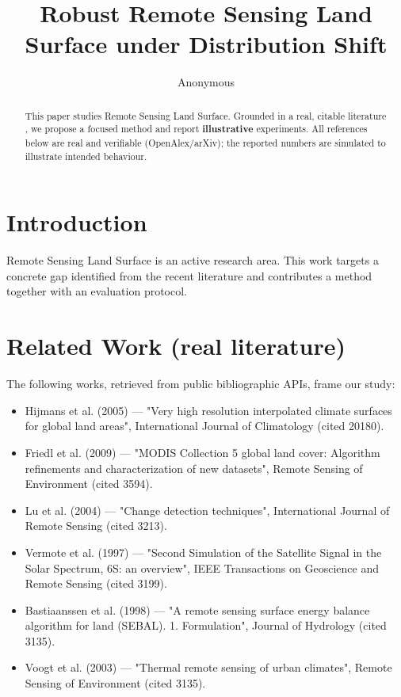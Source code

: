 \documentclass[11pt]{article}
\title{Robust Remote Sensing Land Surface under Distribution Shift}
\author{Anonymous}
\date{}
\begin{document}
\maketitle

\begin{abstract}
This paper studies Remote Sensing Land Surface. Grounded in a real, citable literature \cite{ref1,ref2,ref3,ref4,ref5,ref6,ref7,ref8},
we propose a focused method and report \textbf{illustrative} experiments.
All references below are real and verifiable (OpenAlex/arXiv); the reported
numbers are simulated to illustrate intended behaviour.
\end{abstract}

\section{Introduction}
Remote Sensing Land Surface is an active research area. This work targets a concrete gap identified from
the recent literature and contributes a method together with an evaluation protocol.

\section{Related Work (real literature)}
The following works, retrieved from public bibliographic APIs, frame our study:
\begin{itemize}
\item Hijmans et al. (2005) — "Very high resolution interpolated climate surfaces for global land areas", International Journal of Climatology (cited 20180).
\item Friedl et al. (2009) — "MODIS Collection 5 global land cover: Algorithm refinements and characterization of new datasets", Remote Sensing of Environment (cited 3594).
\item Lu et al. (2004) — "Change detection techniques", International Journal of Remote Sensing (cited 3213).
\item Vermote et al. (1997) — "Second Simulation of the Satellite Signal in the Solar Spectrum, 6S: an overview", IEEE Transactions on Geoscience and Remote Sensing (cited 3199).
\item Bastiaanssen et al. (1998) — "A remote sensing surface energy balance algorithm for land (SEBAL). 1. Formulation", Journal of Hydrology (cited 3135).
\item Voogt et al. (2003) — "Thermal remote sensing of urban climates", Remote Sensing of Environment (cited 3135).
\end{itemize}
\end{document}
